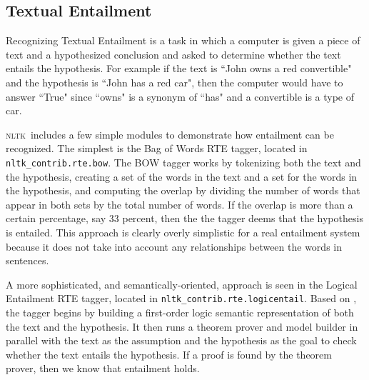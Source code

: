\documentclass[11pt, a4paper]{article}
\newcommand{\NLTK}{\textsc{nltk}}
\newcommand{\dhgcode}[1]{{\tt #1}}
\begin{document}


\subsection{Textual Entailment}
Recognizing Textual Entailment is a task in which a computer is given
a piece of text and a hypothesized conclusion and asked to determine
whether the text entails the hypothesis.  For example if the text is
``John owns a red convertible" and the hypothesis is ``John has a red
car", then the computer would have to answer ``True" since ``owns" is
a synonym of ``has" and a convertible is a type of car.

\NLTK\ includes a few simple modules to demonstrate how entailment can
be recognized.  The simplest is the Bag of Words RTE tagger, located
in \dhgcode{nltk\_contrib.rte.bow}.  The BOW tagger works by
tokenizing both the text and the hypothesis, creating a set of the
words in the text and a set for the words in the hypothesis, and
computing the overlap by dividing the number of words that appear in
both sets by the total number of words.  If the overlap is more than a
certain percentage, say 33 percent, then the the tagger deems that the
hypothesis is entailed.  This approach is clearly overly simplistic
for a real entailment system because it does not take into account any
relationships between the words in sentences.

A more sophisticated, and semantically-oriented, approach is seen in
the Logical Entailment RTE tagger, located in
\dhgcode{nltk\_contrib.rte.logicentail}.  Based on \cite{BosRTE}, the
tagger begins by building a first-order logic semantic representation
of both the text and the hypothesis.  It then runs a theorem prover
and model builder in parallel with the text as the assumption and the
hypothesis as the goal to check whether the text entails the
hypothesis.  If a proof is found by the theorem prover, then we know
that entailment holds.
\end{document}
